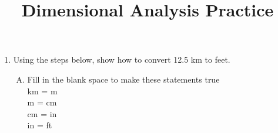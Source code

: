 \documentclass[12pt]{article} %
\title{Dimensional Analysis Practice}
\date{}
\begin{document}
\maketitle

\thispagestyle{empty}
\vspace{-2.5cm}

\begin{enumerate}
\item Using the steps below, show how to convert 12.5 km to feet. 

\begin{enumerate}[A.]
\item Fill in the blank space to make these statements true \\
 \underline{\hspace{2cm}} km =  \underline{\hspace{2cm}}  m \\
 \underline{\hspace{2cm}} m =  \underline{\hspace{2cm}}  cm \\
 \underline{\hspace{2cm}} cm =  \underline{\hspace{2cm}}  in \\
 \underline{\hspace{2cm}} in =  \underline{\hspace{2cm}}  ft \\


\end{enumerate}
\end{enumerate}
\end{document}
